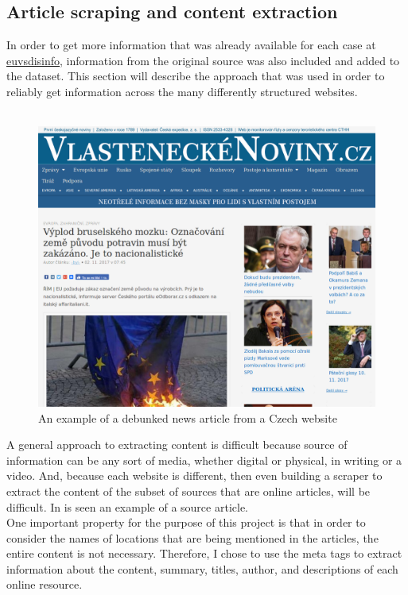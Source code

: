 \documentclass{article}
\begin{document}
\subsection{Article scraping and content extraction}
In order to get more information that was already available for each case at \url{euvsdisinfo}, information from the original source was also included and added to the dataset. This section will describe the approach that was used in order to reliably get information across the many differently structured websites.
\\\\

\begin{figure}[H]
    \centering
    \caption{An example of a debunked news article from a Czech website}
    \label{fig:fake_source}
    \includegraphics[width=.9\textwidth]{images/example_source.png}
\end{figure}
A general approach to extracting content is difficult because source of information can be any sort of media, whether digital or physical, in writing or a video. And, because each website is different, then even building a scraper to extract the content of the subset of sources that are online articles, will be difficult. In  is seen an example of a source article.
\\
One important property for the purpose of this project is that in order to consider the names of locations that are being mentioned in the articles, the entire content is not necessary. Therefore, I chose to use the meta tags to extract information about the content, summary, titles, author, and descriptions of each online resource.
\end{document}
